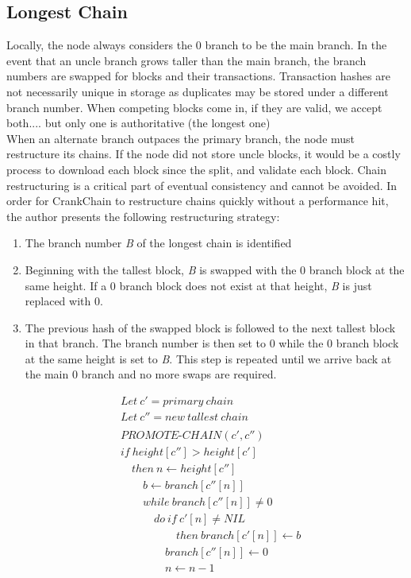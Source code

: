 \documentclass[10pt,twocolumn]{article}
\begin{document}
\subsection{Longest Chain}
Locally, the node always considers the 0 branch to be the main branch.  In the event that an uncle branch grows taller than the main branch, the branch numbers are swapped for blocks and their transactions.  Transaction hashes are not necessarily unique in storage as duplicates may be stored under a different branch number. When competing blocks come in, if they are valid, we accept both.... but only one is authoritative (the longest one)\\
When an alternate branch outpaces the primary branch, the node must restructure its chains.  If the node did not store uncle blocks, it would be a costly process to download each block since the split, and validate each block.  Chain restructuring is a critical part of eventual consistency and cannot be avoided.  In order for CrankChain to restructure chains quickly without a performance hit, the author presents the following restructuring strategy:
\begin{enumerate}[noitemsep]
\item The branch number \textit{B} of the longest chain is identified
\item Beginning with the tallest block, \textit{B} is swapped with the 0 branch block at the same height.  If a 0 branch block does not exist at that height, \textit{B} is just replaced with 0.
\item The previous hash of the swapped block is followed to the next tallest block in that branch.  The branch number is then set to 0 while the 0 branch block at the same height is set to \textit{B}.  This step is repeated until we arrive back at the main 0 branch and no more swaps are required.
\end{enumerate}
\begin{align}
&Let\ c' = primary\ chain\nonumber\\
&Let\ c'' = new\ tallest\ chain\nonumber\\
\nonumber\\
&PROMOTE\mbox{-}CHAIN(c',c'')\nonumber\\
&if\ height[c''] > height[c']\\
&\quad then\ n\leftarrow height[c'']\\
&\quad\quad b\leftarrow branch[c''[n]]\\
&\quad\quad while\ branch[c''[n]]\neq 0\\
&\quad\quad\quad do\ if\ c'[n]\neq NIL\\
&\quad\quad\quad\quad\quad then\ branch[c'[n]]\leftarrow b\\
&\quad\quad\quad\quad branch[c''[n]]\leftarrow 0\\
&\quad\quad\quad\quad n\leftarrow n-1
\end{align}
\end{document}
